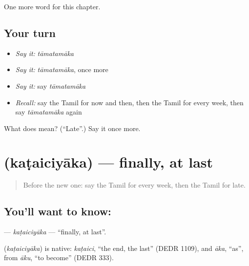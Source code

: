 \begin{grammarlens}[title={What you've built}]
One more word for this chapter.
\end{grammarlens}

\subsection*{Your turn}
\begin{itemize}
\raggedright
  \item \emph{Say it:} \emph{tāmatamāka}
  \item \emph{Say it:} \emph{tāmatamāka}, once more
  \item \emph{Say it:} say \emph{tāmatamāka}
  \item \emph{Recall:} say the Tamil for now and then, then the Tamil for every week, then say \emph{tāmatamāka} again
\end{itemize}

\begin{tcolorbox}[breakable,colback=teal!4,colframe=teal!35!black,title={Before you move on}]
What does  mean? (\textquotedblleft{}Late\textquotedblright{}.) Say it once more.
\end{tcolorbox}
\section[\texorpdfstring{\ta{கடைசியாக} (kaṭaiciyāka)}{கடைசியாக (kaṭaiciyāka)}]{ (kaṭaiciyāka) — finally, at last}

\label{lesson:TA-C262-kataiciyaka}



\begin{quote}
Before the new one: say the Tamil for every week, then the Tamil for late.
\end{quote}

\subsection*{You'll want to know: }
\textbf{} — \emph{kaṭaiciyāka} — \textquotedblleft{}finally, at last\textquotedblright{}.

\begin{cousinweb}
\textbf{} (\emph{kaṭaiciyāka}) is native: \emph{kaṭaici}, \textquotedblleft{}the end, the last\textquotedblright{} (DEDR 1109), and \emph{āka}, \textquotedblleft{}as\textquotedblright{}, from \emph{āku}, \textquotedblleft{}to become\textquotedblright{} (DEDR 333).
\end{cousinweb}

